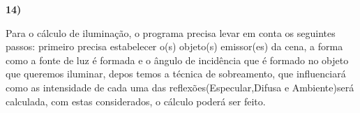 \textbf{14)} 

Para o cálculo de iluminação, o programa precisa levar em conta os seguintes passos:
primeiro precisa estabelecer o(s) objeto(s) emissor(es) da cena, a forma como a fonte de luz 
é formada e o ângulo de incidência que é formado no objeto que queremos iluminar, depos temos
a técnica de sobreamento, que influenciará como as intensidade de cada uma das reflexões(Especular,Difusa e 
Ambiente)será calculada, com estas considerados, o cálculo poderá ser feito.


